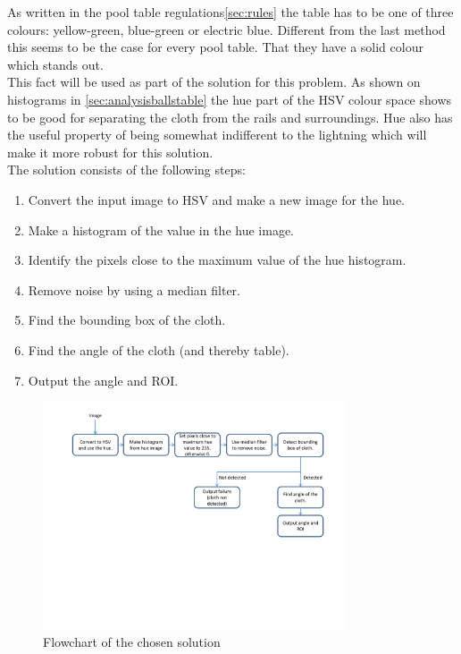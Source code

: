As written in the pool table regulations\ref{sec:rules} the table has to be one of three colours: yellow-green, blue-green or electric blue. Different from the last method this seems to be the case for every pool table. That they have a solid colour which stands out.\\

This fact will be used as part of the solution for this problem. As shown on histograms in \ref{sec:analysisballstable} the hue part of the HSV colour space shows to be good for separating the cloth from the rails and surroundings. Hue also has the useful property of being somewhat indifferent to the lightning which will make it more robust for this solution.\\


The solution consists of the following steps:
\begin{enumerate}
\setlength{\itemsep}{0mm}
	\item Convert the input image to HSV and make a new image for the hue.
	\item Make a histogram of the value in the hue image.
	\item Identify the pixels close to the maximum value of the hue histogram.
	\item Remove noise by using a median filter.
	\item Find the bounding box of the cloth.
	\item Find the angle of the cloth (and thereby table).
	\item Output the angle and ROI.
\end{enumerate}

\begin{figure}[H]
\begin{center}
\leavevmode
\includegraphics[width=0.8\textwidth]{images/tabledetect_flowchart}
\end{center}
\caption{Flowchart of the chosen solution}
\label{fig:tabledetect_flowchart}
\end{figure}

